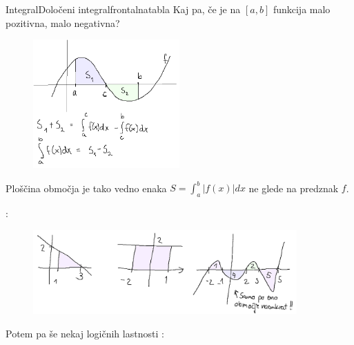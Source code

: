 \begin{priprava}{}{}{Integral}{Določeni integral}{frontalna}{tabla}
Kaj pa, če je na $ [a, b] $ funkcija malo pozitivna, malo negativna?

\begin{figure}[h]
    \centering
    \includegraphics[width=0.5\textwidth]{slike/ploscine2.png}
\end{figure}

Ploščina območja je tako vedno enaka $ S = \int_a^b | f(x) | dx $ ne glede na predznak $ f $.

:

\begin{figure}[h]
    \centering
    \includegraphics[width=0.9\textwidth]{slike/dol_vaje1.png}
\end{figure}

\newpage

Potem pa še nekaj logičnih lastnosti :



\end{priprava}
